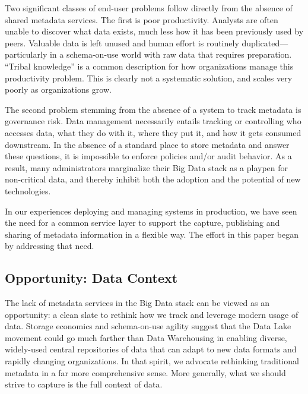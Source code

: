 \documentclass{cidr-2017}
\begin{document}
Two significant classes of end-user problems follow directly from the absence of shared metadata services.
The first is poor productivity.
Analysts are often unable to discover what data exists, much less how it has been previously used by peers. 
Valuable data is left unused
and human effort is routinely duplicated---particularly in a schema-on-use world with raw data that requires preparation.  
``Tribal knowledge'' is a common description for how organizations manage this productivity problem. 
This is clearly not a systematic solution, and scales very poorly as organizations grow.

The second problem 
stemming from the absence of a system to track metadata 
is governance risk. 
Data management necessarily entails tracking or controlling who accesses data, what they do with it, where they put it, and how it gets consumed downstream. 
In the absence of a standard place to store metadata and answer these questions, it is impossible to enforce policies and/or audit behavior. 
As a result, many administrators marginalize their Big Data stack as a playpen for non-critical data, and thereby inhibit both the adoption and the potential of new technologies.

In our experiences deploying and managing systems in production, we 
have seen the need for a common service layer to support the capture, publishing and sharing of metadata information in a flexible way. 
The effort in this paper began by addressing that need.

\subsection{Opportunity: Data Context}
The lack of metadata services in the Big Data stack can be viewed as an opportunity:
a clean slate to rethink how we track and leverage modern usage of data.
Storage economics and schema-on-use agility suggest that the Data Lake movement could go much farther than Data Warehousing in enabling diverse, widely-used central repositories of data that can adapt to new data formats and rapidly changing organizations.
In that spirit, we advocate rethinking traditional metadata in a far more comprehensive sense. 
More generally, what we should strive to capture is the full context of data.
\end{document}
